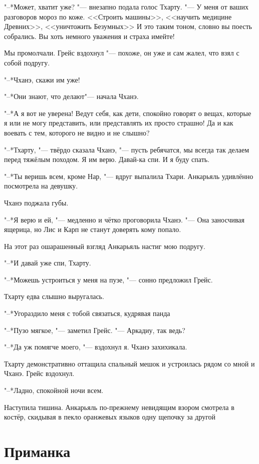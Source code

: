 \documentclass[a4paper,10pt]{book}
\newcommand{\ldotst}{\so{...}\xspace}
\begin{document}
"--*Может, хватит уже? "--- внезапно подала голос Тхарту. "--- У меня от ваших 
разговоров мороз по коже. <<Строить машины>>, <<научить медицине Древних>>, 
<<уничтожить Безумных>>\ldotst И это таким тоном, словно вы поесть собрались. 
Вы 
хоть немного уважения и страха имейте!

Мы промолчали. Грейс вздохнул "--- похоже, он уже и сам жалел, что взял с собой 
подругу.

"--*Чханэ, скажи им уже!

"--*Они знают, что делают\ldotst "--- начала Чханэ.

"--*А я вот не уверена! Ведут себя, как дети, спокойно говорят о вещах, которые 
я или не могу представить, или представлять их просто страшно! Да и как воевать 
с тем, которого не видно и не слышно?

"--*Тхарту, "--- твёрдо сказала Чханэ, "--- пусть ребячатся, мы всегда так 
делаем 
перед тяжёлым походом. Я им верю. Давай-ка спи. И я буду спать.

"--*Ты веришь всем, кроме Нар, "--- вдруг выпалила Тхари. Анкарьяль удивлённо 
посмотрела на девушку.

Чханэ поджала губы.

"--*Я верю и ей, "--- медленно и чётко проговорила Чханэ. "--- Она заносчивая 
ящерица, но Лис и Карп не станут доверять кому попало.

На этот раз ошарашенный взгляд Анкарьяль настиг мою подругу.

"--*И давай уже спи, Тхарту.

"--*Можешь устроиться у меня на пузе, "--- сонно предложил Грейс.

Тхарту едва слышно выругалась.

"--*Угораздило меня с тобой связаться, кудрявая панда\ldotst

"--*Пузо мягкое, "--- заметил Грейс. "--- Аркадиу, так ведь?

"--*Да уж помягче моего, "--- вздохнул я. Чханэ захихикала.

Тхарту демонстративно оттащила спальный мешок и устроилась рядом со мной и 
Чханэ. Грейс вздохнул.

"--*Ладно, спокойной ночи всем.

Наступила тишина. Анкарьяль по-прежнему невидящим взором смотрела в костёр, 
скидывая в пекло оранжевых языков одну щепочку за другой\ldotst 

\section{Приманка}
\end{document}
